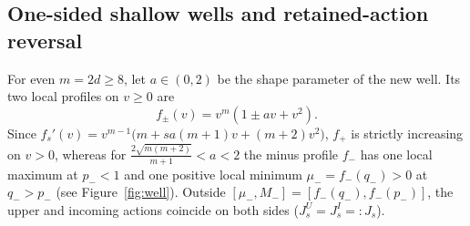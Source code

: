 \subsection{One-sided shallow wells and retained-action reversal}\label{subsec:well-step}
For even $m=2d\ge 8$, let $a\in(0,2)$ be the shape parameter of the
new well. Its two local profiles on $v\ge0$ are
\begin{equation}\label{eq:well-model}
  f_\pm(v) = v^m(1 \pm av + v^2).
\end{equation}
Since $f_s'(v)=v^{m-1}\big(m+sa(m+1)v+(m+2)v^2\big)$, $f_+$ is strictly increasing on $v>0$, whereas for $\frac{2\sqrt{m(m+2)}}{m+1}<a<2$ the minus profile $f_-$ has one local maximum at $p_-<1$ and one positive local minimum $\mu_-=f_-(q_-)>0$ at $q_->p_-$ (see Figure~\ref{fig:well}). Outside $[\mu_-,M_-]=[f_-(q_-),f_-(p_-)]$, the upper and incoming actions coincide on both sides ($J_s^U=J_s^I=:J_s$).

